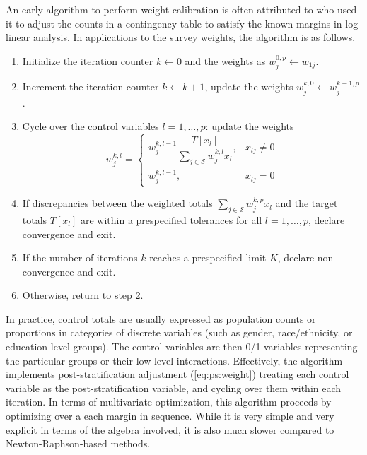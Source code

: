 An early algorithm to perform weight calibration is often attributed to
\citet{deming:stephan:1940} who used it to adjust the counts in a contingency
table to satisfy the known margins in log-linear analysis.
In applications to the survey weights, the algorithm is as follows.
\begin{enumerate}
    \item Initialize the iteration counter $k\leftarrow 0$
          and the weights as $w_j^{0,p} \leftarrow w_{1j}$.
    \item Increment the iteration counter $k \leftarrow k+1$,
          update the weights $w_j^{k,0} \leftarrow w_j^{k-1,p}$.
    \item Cycle over the control variables $l=1,\ldots,p$: update the weights
          $$
            w_j^{k,l} =
                \left\{
                \begin{array}{ll}
                    w_j^{k,l-1} \dfrac{ T[x_l] }{ \sum_{j \in \mathcal{S}} w_j^{k,l} x_l },
                        & x_{lj} \neq 0 \\
                    w_j^{k,l-1},
                        & x_{lj} = 0
                \end{array}
                \right.
          $$
    \item If discrepancies between the weighted totals $\sum_{j \in \mathcal{S}} w_j^{k,p} x_l$
          and the target totals $T[x_l]$ are within a prespecified tolerances for all
          $l=1,\ldots,p$, declare convergence and exit.
    \item If the number of iterations $k$ reaches a prespecified limit $K$,
          declare non-convergence and exit.
    \item Otherwise, return to step 2.
\end{enumerate}
In practice, control totals are usually expressed as population counts 
or proportions in categories of discrete variables (such as gender, 
race/ethnicity, or education level groups).
The control variables are then 0/1 variables representing the particular groups
or their low-level interactions.
Effectively, the algorithm implements post-stratification adjustment
(\ref{eq:ps:weight}) treating each control variable as the post-stratification
variable, and cycling over them within each iteration. In terms of multivariate optimization,
this algorithm proceeds by optimizing over a each margin in sequence.
While it is very simple and very explicit in terms
of the algebra involved, it is also much slower compared 
to Newton-Raphson-based methods.

